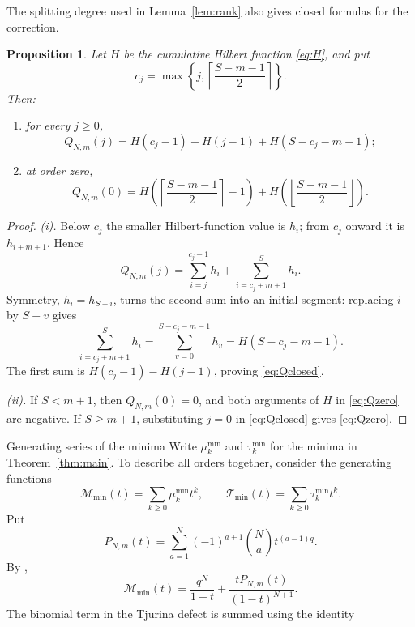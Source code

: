 \documentclass[12pt,reqno]{amsart}
\makeatletter
\renewcommand\subsection{\@startsection{subsection}{2}%
  \z@{.8\linespacing\@plus.3\linespacing}{.35\linespacing}%
  {\normalfont\bfseries}}
\newtheorem{proposition}[theorem]{Proposition}
\theoremstyle{definition}
\makeatother
\begin{document}
The splitting degree used in Lemma~\ref{lem:rank} also gives
closed formulas for the correction.
\begin{proposition}\label{prop:Qclosed}
Let $H$ be the cumulative Hilbert function \eqref{eq:H}, and put
\[
 c_j=\max\left\{j,\left\lceil\frac{S-m-1}{2}\right\rceil\right\}.
\]
Then:
\begin{enumerate}
\item for every $j\geq0$,
\begin{equation}\label{eq:Qclosed}
 Q_{N,m}(j)=H(c_j-1)-H(j-1)+H(S-c_j-m-1);
\end{equation}
\item at order zero,
\begin{equation}\label{eq:Qzero}
 Q_{N,m}(0)=
 H\left(\left\lceil\frac{S-m-1}{2}\right\rceil-1\right)
 +H\left(\left\lfloor\frac{S-m-1}{2}\right\rfloor\right).
\end{equation}
\end{enumerate}
\end{proposition}
\begin{proof}
\emph{(i).} Below $c_j$ the smaller Hilbert-function value is
$h_i$; from $c_j$ onward it is $h_{i+m+1}$. Hence
\[
 Q_{N,m}(j)=\sum_{i=j}^{c_j-1}h_i+\sum_{i=c_j+m+1}^{S}h_i.
\]
Symmetry, $h_i=h_{S-i}$, turns the second sum into an initial
segment: replacing $i$ by $S-v$ gives
\[
 \sum_{i=c_j+m+1}^{S}h_i
       =\sum_{v=0}^{S-c_j-m-1}h_v=H(S-c_j-m-1).
\]
The first sum is $H(c_j-1)-H(j-1)$, proving \eqref{eq:Qclosed}.

\emph{(ii).} If $S<m+1$, then $Q_{N,m}(0)=0$, and both
arguments of $H$ in \eqref{eq:Qzero} are negative. If $S\geq m+1$,
substituting $j=0$ in \eqref{eq:Qclosed} gives \eqref{eq:Qzero}.

\end{proof}


\subsection{Generating series of the minima}
Write $\mu_k^{\min}$ and $\tau_k^{\min}$ for the minima in
Theorem~\ref{thm:main}.  To describe all orders together, consider the generating functions
\[
 \mathcal M_{\min}(t)=\sum_{k\geq0}\mu_k^{\min}t^k,
 \qquad
 \mathcal T_{\min}(t)=\sum_{k\geq0}\tau_k^{\min}t^k.
\]
Put
\[
 P_{N,m}(t)=\sum_{a=1}^N(-1)^{a+1}\binom Na t^{(a-1)q}.
\]
By \cite[equation~(4.5)]{LiuYauZhang2026},
\begin{equation}\label{eq:Mseries}
 \mathcal M_{\min}(t)=\frac{q^N}{1-t}
          +\frac{tP_{N,m}(t)}{(1-t)^{N+1}}.
\end{equation}
The binomial term in the Tjurina defect is summed using the identity
\end{document}
